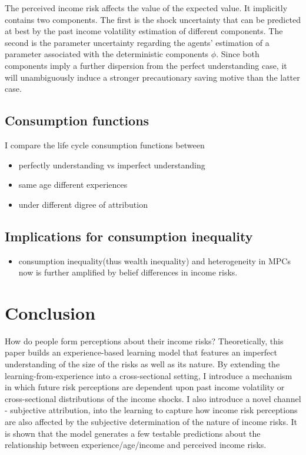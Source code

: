 \documentclass[12pt,notitlepage,onecolumn,aps,pra]{article}
\providecommand{\tightlist}{%
      \setlength{\itemsep}{0pt}\setlength{\parskip}{0pt}}
\begin{document}
The perceived income risk affects the value of the expected value. It
implicitly contains two components. The first is the shock uncertainty
that can be predicted at best by the past income volatility estimation
of different components. The second is the parameter uncertainty
regarding the agents' estimation of a parameter associated with the
deterministic components \(\phi\). Since both components imply a further
dispersion from the perfect understanding case, it will unambiguously
induce a stronger precautionary saving motive than the latter case.

\hypertarget{consumption-functions}{%
\subsection{Consumption functions}\label{consumption-functions}}

I compare the life cycle consumption functions between

\begin{itemize}
\tightlist
\item
  perfectly understanding vs imperfect understanding
\item
  same age different experiences
\item
  under different digree of attribution
\end{itemize}

\hypertarget{implications-for-consumption-inequality}{%
\subsection{Implications for consumption
inequality}\label{implications-for-consumption-inequality}}

\begin{itemize}
\tightlist
\item
  consumption inequality(thus wealth inequality) and heterogeneity in
  MPCs now is further amplified by belief differences in income risks.
\end{itemize}

    \hypertarget{conclusion}{%
\section{Conclusion}\label{conclusion}}

How do people form perceptions about their income risks? Theoretically,
this paper builds an experience-based learning model that features an
imperfect understanding of the size of the risks as well as its nature.
By extending the learning-from-experience into a cross-sectional
setting, I introduce a mechanism in which future risk perceptions are
dependent upon past income volatility or cross-sectional distributions
of the income shocks. I also introduce a novel channel - subjective
attribution, into the learning to capture how income risk perceptions
are also affected by the subjective determination of the nature of
income risks. It is shown that the model generates a few testable
predictions about the relationship between experience/age/income and
perceived income risks.
\end{document}
